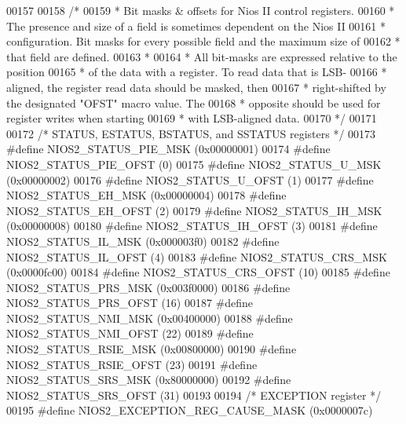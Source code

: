 \begin{DoxyCode}
{{{00157 
00158 \textcolor{comment}{/*}
00159 \textcolor{comment}{ * Bit masks & offsets for Nios II control registers.}
00160 \textcolor{comment}{ * The presence and size of a field is sometimes dependent on the Nios II}
00161 \textcolor{comment}{ * configuration.  Bit masks for every possible field and the maximum size of}
00162 \textcolor{comment}{ * that field are defined.}
00163 \textcolor{comment}{ *}
00164 \textcolor{comment}{ * All bit-masks are expressed relative to the position}
00165 \textcolor{comment}{ * of the data with a register. To read data that is LSB-}
00166 \textcolor{comment}{ * aligned, the register read data should be masked, then}
00167 \textcolor{comment}{ * right-shifted by the designated "OFST" macro value. The}
00168 \textcolor{comment}{ * opposite should be used for register writes when starting}
00169 \textcolor{comment}{ * with LSB-aligned data.}
00170 \textcolor{comment}{ */}
00171 
00172 \textcolor{comment}{/* STATUS, ESTATUS, BSTATUS, and SSTATUS registers */}
00173 \textcolor{preprocessor}{#define NIOS2\_STATUS\_PIE\_MSK  (0x00000001)}
00174 \textcolor{preprocessor}{#define NIOS2\_STATUS\_PIE\_OFST (0)}
00175 \textcolor{preprocessor}{#define NIOS2\_STATUS\_U\_MSK    (0x00000002)}
00176 \textcolor{preprocessor}{#define NIOS2\_STATUS\_U\_OFST   (1)}
00177 \textcolor{preprocessor}{#define NIOS2\_STATUS\_EH\_MSK   (0x00000004)}
00178 \textcolor{preprocessor}{#define NIOS2\_STATUS\_EH\_OFST  (2)}
00179 \textcolor{preprocessor}{#define NIOS2\_STATUS\_IH\_MSK     (0x00000008)}
00180 \textcolor{preprocessor}{#define NIOS2\_STATUS\_IH\_OFST    (3)}
00181 \textcolor{preprocessor}{#define NIOS2\_STATUS\_IL\_MSK     (0x000003f0)}
00182 \textcolor{preprocessor}{#define NIOS2\_STATUS\_IL\_OFST    (4)}
00183 \textcolor{preprocessor}{#define NIOS2\_STATUS\_CRS\_MSK    (0x0000fc00)}
00184 \textcolor{preprocessor}{#define NIOS2\_STATUS\_CRS\_OFST   (10)}
00185 \textcolor{preprocessor}{#define NIOS2\_STATUS\_PRS\_MSK    (0x003f0000)}
00186 \textcolor{preprocessor}{#define NIOS2\_STATUS\_PRS\_OFST   (16)}
00187 \textcolor{preprocessor}{#define NIOS2\_STATUS\_NMI\_MSK    (0x00400000)}
00188 \textcolor{preprocessor}{#define NIOS2\_STATUS\_NMI\_OFST   (22)}
00189 \textcolor{preprocessor}{#define NIOS2\_STATUS\_RSIE\_MSK   (0x00800000)}
00190 \textcolor{preprocessor}{#define NIOS2\_STATUS\_RSIE\_OFST  (23)}
00191 \textcolor{preprocessor}{#define NIOS2\_STATUS\_SRS\_MSK    (0x80000000)}
00192 \textcolor{preprocessor}{#define NIOS2\_STATUS\_SRS\_OFST   (31)}
00193 
00194 \textcolor{comment}{/* EXCEPTION register */}
00195 \textcolor{preprocessor}{#define NIOS2\_EXCEPTION\_REG\_CAUSE\_MASK (0x0000007c)}
}}}
\end{DoxyCode}
